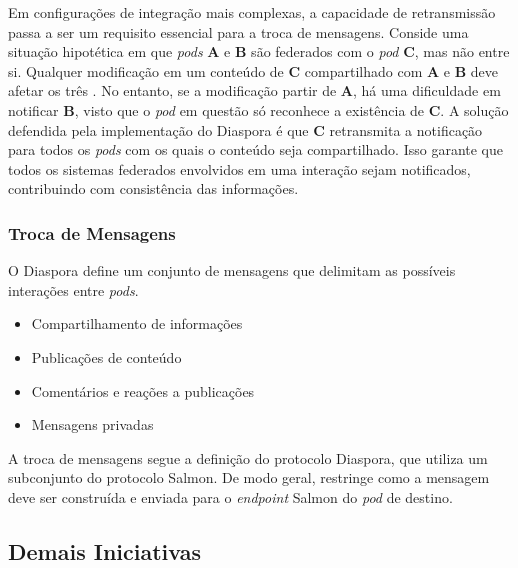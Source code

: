 Em configurações de integração mais complexas, a capacidade de retransmissão passa a
ser um requisito essencial para a troca de mensagens. Conside uma situação
hipotética em que \textit{pods} \textbf{A} e \textbf{B} são federados com o
\textit{pod} \textbf{C}, mas não entre si. Qualquer modificação em um conteúdo de 
\textbf{C} compartilhado com \textbf{A} e \textbf{B} deve afetar os três 
. No entanto, se a modificação partir de \textbf{A}, há uma dificuldade
em notificar \textbf{B}, visto que o \textit{pod} em questão só reconhece a 
existência de \textbf{C}. A solução defendida pela implementação do Diaspora é que
\textbf{C} retransmita a notificação para todos os \textit{pods} com os quais o
conteúdo seja compartilhado. Isso garante que todos os sistemas federados envolvidos
em uma interação sejam notificados, contribuindo com consistência das informações.

\subsubsection{Troca de Mensagens}

O Diaspora define um conjunto de mensagens que delimitam as possíveis interações 
entre \textit{pods}.

\begin{itemize}
  \item{Compartilhamento de informações}
  \item{Publicações de conteúdo}
  \item{Comentários e reações a publicações}
  \item{Mensagens privadas}
\end{itemize}

A troca de mensagens segue a definição do protocolo Diaspora, que utiliza um
subconjunto do protocolo Salmon. De modo geral, restringe como a mensagem deve ser
construída e enviada para o \textit{endpoint} Salmon do \textit{pod} de destino. 

\subsection{Demais Iniciativas}
